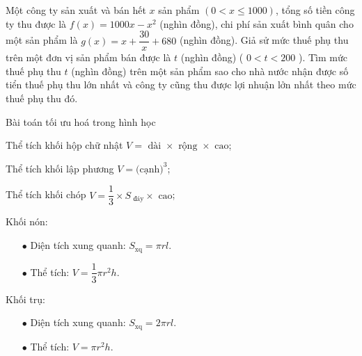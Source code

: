 \begin{vd}%
	Một công ty sản xuất và bán hết $x$ sản phẩm $(0<x \leq 1000)$, tổng số tiền công ty thu được là $f(x)=1000 x-x^2$ (nghìn đồng), chi phí sản xuất bình quân cho một sản phẩm là $g(x)=x+\dfrac{30}{x}+680$ (nghìn đồng). Giả sử mức thuế phụ thu trên một đơn vị sản phẩm bán được là $t$ (nghìn đồng) ( $0<t<200$ ). Tìm mức thuế phụ thu $t$ (nghìn đồng) trên một sản phẩm sao cho nhà nước nhận được số tiển thuế phụ thu lớn nhất và công ty cũng thu được lợi nhuận lởn nhất theo mức thuế phụ thu đó.
\end{vd} 
\begin{dang}{Bài toán tối ưu hoá trong hình học}
	\begin{listEX}[1]
		\item [\ding{172}] Thể tích khối hộp chữ nhật $V= \text{ dài } \times \text{ rộng } \times  \text{ cao}$;
		\item [\ding{173}] Thể tích khối lập phương $V= \text{(cạnh)}^3$;
		\item [\ding{174}] Thể tích khối chóp $V= \dfrac{1}{3} \times S_{\text{ đáy}} \times \text{ cao}$;
		\item [\ding{175}] Khối nón:
		\begin{itemize}
			\item [$\bullet$] Diện tích xung quanh: $S_{\text{xq}}=\pi r l$.
			\item [$\bullet$] Thể tích: $V= \dfrac{1}{3} \pi r^2h$.
		\end{itemize}
		\item [\ding{176}] Khối trụ:
		\begin{itemize}
			\item [$\bullet$] Diện tích xung quanh: $S_{\text{xq}}=2\pi r l$.
			\item [$\bullet$] Thể tích: $V= \pi r^2h$.
		\end{itemize}
	\end{listEX}
\end{dang}

